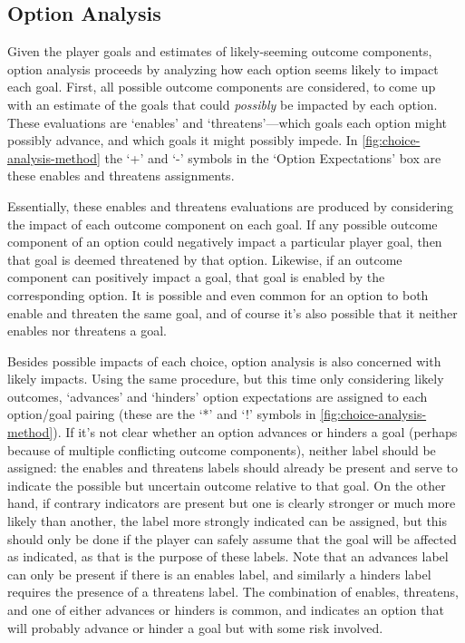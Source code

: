 \subsection{Option Analysis}

\label{sec:cp-option-analysis}

Given the player goals and estimates of likely-seeming outcome components, option analysis proceeds by analyzing how each option seems likely to impact each goal.
%
First, all possible outcome components are considered, to come up with an estimate of the goals that could \emph{possibly} be impacted by each option.
%
These evaluations are `enables' and `threatens'---which goals each option might possibly advance, and which goals it might possibly impede.
%
In \cref{fig:choice-analysis-method} the `+' and `-' symbols in the `Option Expectations' box are these enables and threatens assignments.


Essentially, these enables and threatens evaluations are produced by considering the impact of each outcome component on each goal.
%
If any possible outcome component of an option could negatively impact a particular player goal, then that goal is deemed threatened by that option.
%
Likewise, if an outcome component can positively impact a goal, that goal is enabled by the corresponding option.
%
It is possible and even common for an option to both enable and threaten the same goal, and of course it's also possible that it neither enables nor threatens a goal.


Besides possible impacts of each choice, option analysis is also concerned with likely impacts.
%
Using the same procedure, but this time only considering likely outcomes, `advances' and `hinders' option expectations are assigned to each option/goal pairing (these are the `*' and `!' symbols in \cref{fig:choice-analysis-method}).
%
If it's not clear whether an option advances or hinders a goal (perhaps because of multiple conflicting outcome components), neither label should be assigned: the enables and threatens labels should already be present and serve to indicate the possible but uncertain outcome relative to that goal.
%
On the other hand, if contrary indicators are present but one is clearly stronger or much more likely than another, the label more strongly indicated can be assigned, but this should only be done if the player can safely assume that the goal will be affected as indicated, as that is the purpose of these labels.
%
Note that an advances label can only be present if there is an enables label, and similarly a hinders label requires the presence of a threatens label.
%
The combination of enables, threatens, and one of either advances or hinders is common, and indicates an option that will probably advance or hinder a goal but with some risk involved.


